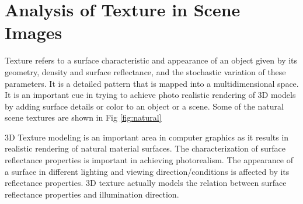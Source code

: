 \section{Analysis of Texture in Scene Images}

Texture refers to a surface characteristic and appearance of an object given by
its geometry, density and surface reflectance, and the stochastic variation of
these parameters.
It is a detailed pattern that is mapped into a multidimensional space.
It is an important cue in trying to achieve photo realistic
rendering of 3D models by adding surface details or color to an object or a
scene. Some of the natural scene textures are shown in Fig \ref{fig:natural}

3D Texture modeling is an important area in computer graphics as it results in realistic rendering
of natural material surfaces. The characterization of surface reflectance properties is important in
achieving photorealism. The appearance of a surface in different lighting and viewing direction/conditions
is affected by its reflectance properties. 3D texture actually models the relation
between surface reflectance properties and illumination direction.

